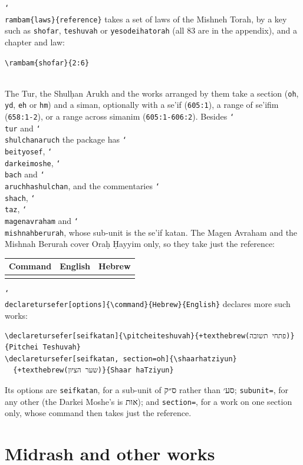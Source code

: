 \documentclass[11pt]{article}
\makeatletter
\newcommand{\cs}[1]{\texttt{\char`\\#1}}
\newenvironment{examples}
	{\begin{center}\small\begin{tabular}{@{}lll@{}}\toprule Command & English & Hebrew \\ \midrule}
	{\bottomrule\end{tabular}\end{center}}
\makeatother
\begin{document}
\cs{rambam}\verb|{laws}{reference}| takes a set of laws of the Mishneh Torah, by a key such as
\texttt{shofar}, \texttt{teshuvah} or \texttt{yesodeihatorah} (all 83 are in the appendix), and a
chapter and law:
\begin{center}
\verb|\rambam{shofar}{2:6}|\\[0.3em]
\\
\texthebrew{}
\end{center}

The Tur, the Shulḥan Arukh and the works arranged by them take a section (\texttt{oh},
\texttt{yd}, \texttt{eh} or \texttt{hm}) and a siman, optionally with a se'if
(\texttt{605:1}), a range of se'ifim (\texttt{658:1-2}), or a range across simanim
(\texttt{605:1-606:2}). Besides \cs{tur} and \cs{shulchanaruch} the package has
\cs{beityosef}, \cs{darkeimoshe}, \cs{bach} and \cs{aruchhashulchan}, and the commentaries
\cs{shach}, \cs{taz}, \cs{magenavraham} and \cs{mishnahberurah}, whose sub-unit is the se'if
katan. The Magen Avraham and the Mishnah Berurah cover Oraḥ Ḥayyim only, so they take just the
reference:
\begin{examples}
\row{\shulchanaruch{oh}{605:1}}
\row{\tur{yd}{114}}
\row{\shach{yd}{114:3}}
\row{\darkeimoshe{oh}{605:3}}
\row{\mishnahberurah{605:3}}
\end{examples}
\cs{declaretursefer}\verb|[options]{\command}{Hebrew}{English}| declares more such works:
\begin{Verbatim}[commandchars=+\(\)]
\declaretursefer[seifkatan]{\pitcheiteshuvah}{+texthebrew(פתחי תשובה)}{Pitchei Teshuvah}
\declaretursefer[seifkatan, section=oh]{\shaarhatziyun}
  {+texthebrew(שער הציון)}{Shaar haTziyun}
\end{Verbatim}
Its options are \texttt{seifkatan}, for a sub-unit of \texthebrew{ס״ק} rather than
\texthebrew{סע׳}; \texttt{subunit=}, for any other (the Darkei Moshe's is \texthebrew{אות});
and \texttt{section=}, for a work on one section only, whose command then takes just the
reference.

\section{Midrash and other works}\label{sec:sefer}
\end{document}

